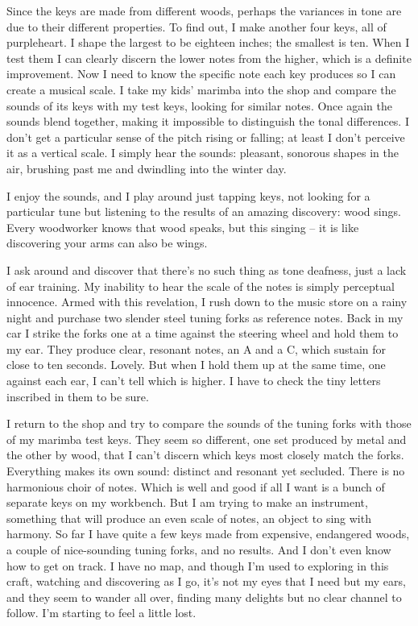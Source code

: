 \documentclass[letterpaper,10pt,headsepline]{scrreprt}
\begin{document}
Since the keys are made from different woods, perhaps the variances in tone are due to their different properties. To find out, I make another four keys, all of purpleheart. I shape the largest to be eighteen inches; the smallest is ten. When I test them I can clearly discern the lower notes from the higher, which is a definite improvement. Now I need to know the specific note each key produces so I can create a musical scale. I take my kids’ marimba into the shop and compare the sounds of its keys with my test keys, looking for similar notes. Once again the sounds blend together, making it impossible to distinguish the tonal differences. I ­don’t get a particular sense of the pitch rising or falling; at least I ­don’t perceive it as a vertical scale. I simply hear the sounds: pleasant, sonorous shapes in the air, brushing past me and dwindling into the winter day.

I enjoy the sounds, and I play around just tapping keys, not looking for a particular tune but listening to the results of an amazing discovery: wood sings. Every woodworker knows that wood speaks, but this singing – it is like discovering your arms can also be wings.

I ask around and discover that there’s no such thing as tone deafness, just a lack of ear training. My inability to hear the scale of the notes is simply perceptual innocence. Armed with this revelation, I rush down to the music store on a rainy night and purchase two slender steel tuning forks as reference notes. Back in my car I strike the forks one at a time against the steering wheel and hold them to my ear. They produce clear, resonant notes, an A and a C, which sustain for close to ten seconds. Lovely. But when I hold them up at the same time, one against each ear, I ­can’t tell which is higher. I have to check the tiny letters inscribed in them to be sure.

I return to the shop and try to compare the sounds of the tuning forks with those of my marimba test keys. They seem so different, one set produced by metal and the other by wood, that I ­can’t discern which keys most closely match the forks. Everything makes its own sound: distinct and resonant yet secluded. There is no harmonious choir of notes. Which is well and good if all I want is a bunch of separate keys on my workbench. But I am trying to make an instrument, something that will produce an even scale of notes, an object to sing with harmony. So far I have quite a few keys made from expensive, endangered woods, a couple of nice-­sounding tuning forks, and no results. And I ­don’t even know how to get on track. I have no map, and though I’m used to exploring in this craft, watching and discovering as I go, it’s not my eyes that I need but my ears, and they seem to wander all over, finding many delights but no clear channel to follow. I’m starting to feel a little lost.
\end{document}
